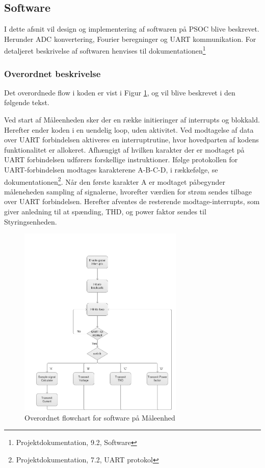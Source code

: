 
\subsection{Software}
I dette afsnit vil design og implementering af softwaren på PSOC blive beskrevet. Herunder ADC konvertering, Fourier beregninger og  UART kommunikation. For detaljeret beskrivelse af softwaren henvises til dokumentationen\footnote{Projektdokumentation, 9.2, Software}

\subsubsection{Overordnet beskrivelse}
Det overordnede flow i koden er vist i Figur \ref{fig:MEflowchart}, og vil blive beskrevet i den følgende tekst.  

Ved start af Måleenheden sker der en række initieringer af interrupts og blokkald. Herefter ender koden i en uendelig loop, uden aktivitet. Ved modtagelse af data over UART forbindelsen aktiveres en interruptrutine, hvor hovedparten af kodens funktionalitet er allokeret. 
Afhængigt af hvilken karakter der er modtaget på UART forbindelsen udførers forskellige instruktioner. Ifølge protokollen for UART-forbindelsen modtages karakterene A-B-C-D, i rækkefølge, se dokumentationen\footnote{Projektdokumentation, 7.2, UART protokol}.
Når den første karakter A er modtaget påbegynder måleneheden sampling af signalerne, hvorefter værdien for strøm sendes tilbage over UART forbindelsen. Herefter afventes de resterende modtage-interrupts, som giver anledning til at spænding, THD, og power faktor sendes til Styringsenheden. 
\begin{figure}[H] %
	\centering
	\includegraphics[width=0.7\textwidth]{Figure/MEflowchart.png}
	\caption{Overordnet flowchart for software på Måleenhed}
	\label{fig:MEflowchart}
\end{figure}




